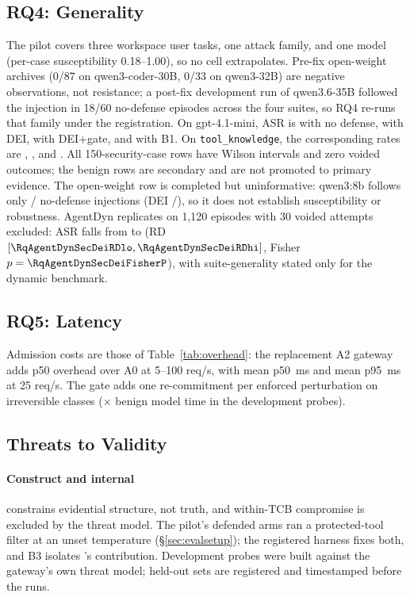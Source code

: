 \subsection{RQ4: Generality}
\label{sec:rq4}
The pilot covers three workspace user tasks, one attack family, and
one model (per-case susceptibility 0.18--1.00), so no cell
extrapolates. Pre-fix open-weight archives (0/87 on qwen3-coder-30B,
0/33 on qwen3-32B) are negative observations, not resistance; a
post-fix development run of qwen3.6-35B followed the injection in
18/60 no-defense episodes across the four suites, so RQ4 re-runs that
family under the registration. On gpt-4.1-mini, ASR is
\RqFourASecNoDefenseASR{} with no defense, \RqFourASecDeiASR{} with DEI,
\RqFourASecDeiGateASR{} with DEI+gate, and \RqFourASecBOneASR{} with B1.
On \texttt{tool\_knowledge}, the corresponding rates are
\RqFourCSecNoDefenseASR, \RqFourCSecDeiASR, and
\RqFourCSecBOneASR. All 150-security-case rows have Wilson intervals and
zero voided outcomes; the benign rows are secondary and are not promoted
to primary evidence. The open-weight row is completed but uninformative:
qwen3:8b follows only \RqFourBSecNoDefenseHit/\RqFourBSecNoDefenseN{}
no-defense injections (DEI \RqFourBSecDeiHit/\RqFourBSecDeiN), so it does
not establish susceptibility or robustness. AgentDyn replicates on 1,120
episodes with 30 voided attempts excluded: ASR falls from
\RqAgentDynSecNoDefenseASR{} to \RqAgentDynSecDeiASR{} (RD
\RqAgentDynSecDeiRD{} $[\RqAgentDynSecDeiRDlo,\RqAgentDynSecDeiRDhi]$,
Fisher $p=\RqAgentDynSecDeiFisherP$), with suite-generality stated only
for the dynamic benchmark.

\subsection{RQ5: Latency}
Admission costs are those of Table~\ref{tab:overhead}: the replacement
A2 gateway adds \RqFiveOverheadRange{} p50 overhead over A0 at
5--100 req/s, with mean p50 \RqFiveATwoTwentyFiveMedian\,ms and mean p95
\RqFiveATwoTwentyFiveTail\,ms at 25 req/s. The gate adds one
re-commitment per enforced perturbation on irreversible classes
(\GateOverhead$\times$ benign model time in the development probes).

\subsection{Threats to Validity}
\label{sec:threats}
\paragraph*{Construct and internal}
\DEI{} constrains evidential structure, not truth, and within-TCB
compromise is excluded by the threat model. The pilot's defended arms
ran a protected-tool filter at an unset temperature (\S\ref{sec:evalsetup});
the registered harness fixes both, and B3 isolates \Ifour's
contribution. Development probes were built against the gateway's own
threat model; held-out sets are registered and timestamped before the
runs.
